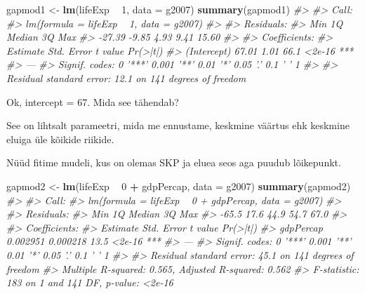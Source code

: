 \documentclass[]{book}
\newenvironment{Shaded}{\begin{snugshade}}{\end{snugshade}}
\newcommand{\KeywordTok}[1]{\textcolor[rgb]{0.13,0.29,0.53}{\textbf{#1}}}
\newcommand{\DataTypeTok}[1]{\textcolor[rgb]{0.13,0.29,0.53}{#1}}
\newcommand{\DecValTok}[1]{\textcolor[rgb]{0.00,0.00,0.81}{#1}}
\newcommand{\StringTok}[1]{\textcolor[rgb]{0.31,0.60,0.02}{#1}}
\newcommand{\CommentTok}[1]{\textcolor[rgb]{0.56,0.35,0.01}{\textit{#1}}}
\newcommand{\OperatorTok}[1]{\textcolor[rgb]{0.81,0.36,0.00}{\textbf{#1}}}
\newcommand{\NormalTok}[1]{#1}
\begin{document}
\begin{Shaded}
\begin{Highlighting}[]
\NormalTok{gapmod1 <-}\StringTok{ }\KeywordTok{lm}\NormalTok{(lifeExp }\OperatorTok{~}\StringTok{ }\DecValTok{1}\NormalTok{, }\DataTypeTok{data =}\NormalTok{ g2007)}
\KeywordTok{summary}\NormalTok{(gapmod1)}
\CommentTok{#> }
\CommentTok{#> Call:}
\CommentTok{#> lm(formula = lifeExp ~ 1, data = g2007)}
\CommentTok{#> }
\CommentTok{#> Residuals:}
\CommentTok{#>    Min     1Q Median     3Q    Max }
\CommentTok{#> -27.39  -9.85   4.93   9.41  15.60 }
\CommentTok{#> }
\CommentTok{#> Coefficients:}
\CommentTok{#>             Estimate Std. Error t value Pr(>|t|)    }
\CommentTok{#> (Intercept)    67.01       1.01    66.1   <2e-16 ***}
\CommentTok{#> ---}
\CommentTok{#> Signif. codes:  0 '***' 0.001 '**' 0.01 '*' 0.05 '.' 0.1 ' ' 1}
\CommentTok{#> }
\CommentTok{#> Residual standard error: 12.1 on 141 degrees of freedom}
\end{Highlighting}
\end{Shaded}

Ok, intercept = 67. Mida see tähendab?

\begin{Shaded}
\end{Shaded}

See on lihtsalt parameetri, mida me ennustame, keskmine väärtus ehk
keskmine eluiga üle kõikide riikide.

Nüüd fitime mudeli, kus on olemas SKP ja eluea seos aga puudub
lõikepunkt.

\begin{Shaded}
\begin{Highlighting}[]
\NormalTok{gapmod2 <-}\StringTok{ }\KeywordTok{lm}\NormalTok{(lifeExp }\OperatorTok{~}\StringTok{ }\DecValTok{0} \OperatorTok{+}\StringTok{ }\NormalTok{gdpPercap, }\DataTypeTok{data =}\NormalTok{ g2007)}
\KeywordTok{summary}\NormalTok{(gapmod2)}
\CommentTok{#> }
\CommentTok{#> Call:}
\CommentTok{#> lm(formula = lifeExp ~ 0 + gdpPercap, data = g2007)}
\CommentTok{#> }
\CommentTok{#> Residuals:}
\CommentTok{#>    Min     1Q Median     3Q    Max }
\CommentTok{#>  -65.5   17.6   44.9   54.7   67.0 }
\CommentTok{#> }
\CommentTok{#> Coefficients:}
\CommentTok{#>           Estimate Std. Error t value Pr(>|t|)    }
\CommentTok{#> gdpPercap 0.002951   0.000218    13.5   <2e-16 ***}
\CommentTok{#> ---}
\CommentTok{#> Signif. codes:  0 '***' 0.001 '**' 0.01 '*' 0.05 '.' 0.1 ' ' 1}
\CommentTok{#> }
\CommentTok{#> Residual standard error: 45.1 on 141 degrees of freedom}
\CommentTok{#> Multiple R-squared:  0.565,  Adjusted R-squared:  0.562 }
\CommentTok{#> F-statistic:  183 on 1 and 141 DF,  p-value: <2e-16}
\end{Highlighting}
\end{Shaded}
\end{document}
